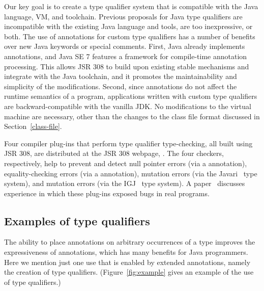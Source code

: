 \documentclass[10pt]{article}
\begin{document}
Our key goal is to create a type qualifier system that is compatible with
the Java language, VM, and toolchain.
Previous proposals
for Java type qualifiers are incompatible with the existing Java language
and tools, are too inexpressive, or both.
The use of annotations for custom type qualifiers has a number of
benefits over new Java keywords or special comments. First, Java
already implements annotations, and Java SE 7 features a framework
for compile-time annotation processing. This allows JSR 308 to
build upon existing stable mechanisms and integrate with the Java
toolchain, and it promotes the maintainability and simplicity of the
modifications. Second, since annotations do not affect the runtime
semantics of a program, applications written with custom type
qualifiers are backward-compatible with the vanilla JDK\@.
No modifications to the virtual machine are necessary,
other than the changes to the class file format discussed in
Section~\ref{class-file}.

Four compiler plug-ins that perform type qualifier type-checking, all built
using JSR 308, are distributed at the JSR 308 webpage,
.  The four checkers, respectively,
help to prevent and detect null pointer errors (via a 
annotation), equality-checking errors (via a  annotation),
mutation errors (via the Javari~\cite{BirkaE2004,TschantzE2005} type
system), and mutation errors (via the IGJ~\cite{ZibinPAAKE2007} type
system).  A paper~\cite{PapiACPE2008} discusses experience
in which these plug-ins exposed bugs in real programs.


\subsection{Examples of type qualifiers\label{type-qualifier-examples}}

The ability to place annotations on arbitrary occurrences of a type
improves the expressiveness of annotations, which has many benefits for
Java programmers.  Here we mention just one use that is enabled by extended
annotations, namely the creation of type qualifiers.
(Figure~\ref{fig:example} gives an example of the use of type qualifiers.)
\end{document}
